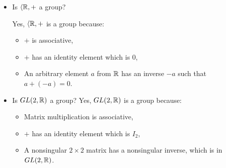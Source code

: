     \begin{example}
        \mbox{}

        \begin{itemize}
            \item Is \(\langle \mathbb{R}, +\) a group?

            Yes, \(\langle \mathbb{R}, +\) is a group because:
            \begin{itemize}
                \item \(+\) is associative,
                \item \(+\) has an identity element which is \(0\),
                \item An arbitrary element \(a\) from \(\mathbb{R}\) has an inverse \(-a\) such that \(a + (-a) = 0\).
            \end{itemize}

            \item Is \(GL(2, \mathbb{R})\) a group?
            Yes, \(GL(2, \mathbb{R})\) is a group because:
            \begin{itemize}
                \item Matrix multiplication is associative,
                \item \(+\) has an identity element which is \(I_2\),
                \item A nonsingular \(2 \times 2\) matrix has a nonsingular inverse, which is in \(GL(2, \mathbb{R})\).
            \end{itemize}
        \end{itemize}
    \end{example}

